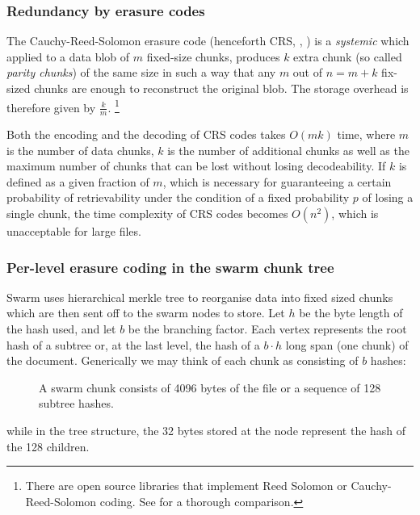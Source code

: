 \subsubsection{Redundancy by erasure codes}\label{sec:erasure}


The Cauchy-Reed-Solomon erasure code (henceforth CRS, \cite{lubyetal1995CRS}, \cite{plank2006optimizing}) is a \emph{systemic}  which applied to a data blob of $m$ fixed-size chunks, produces $k$ extra chunk (so called \emph{parity chunks}) of the same size in such a way that any $m$ out of $n=m+k$ fix-sized chunks are enough to reconstruct the original blob. The storage overhead is therefore given by $\frac{k}{m}$.%
%
\footnote{%
There are open source libraries that implement Reed Solomon or Cauchy-Reed-Solomon coding. See \cite{plank2009performance} for a thorough comparison.}

Both the encoding and the decoding of CRS codes takes $O(mk)$ time, where $m$ is the number of data chunks, $k$ is the number of additional chunks as well as the maximum number of chunks that can be lost without losing decodeability. If $k$ is defined as a given fraction of $m$, which is necessary for guaranteeing a certain probability of retrievability under the condition of a fixed probability $p$ of losing a single chunk, the time complexity of CRS codes becomes $O(n^2)$, which is unacceptable for large files. 

\subsubsection{Per-level erasure coding in the swarm chunk tree}

Swarm uses hierarchical merkle tree \cite{merkle1980protocols} to reorganise data into fixed sized chunks which are then sent off to the swarm nodes to store.
Let $h$ be the byte length of the hash used, and let $b$ be the branching factor. Each vertex represents the root hash of a subtree or, at the last level, the hash of a $b\cdot h$ long span (one chunk) of the document. Generically we may think of each chunk as consisting of $b$ hashes:


\begin{figure}[htbp]
   \centering
   
   \caption{A swarm chunk consists of 4096 bytes of the file or a sequence of 128 subtree hashes.}
   \label{fig:chunk}
\end{figure}

while in the tree structure, the 32 bytes stored at the node represent the hash of the 128 children.

